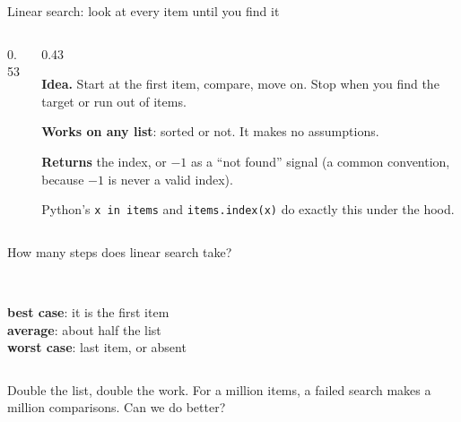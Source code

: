 \documentclass[aspectratio=169,10pt]{beamer}
\begin{document}
\begin{frame}{Linear search: look at every item until you find it}
\begin{columns}[T]
\begin{column}{0.53\textwidth}
\vspace{2mm}
\end{column}
\begin{column}{0.43\textwidth}
{\small
\textbf{Idea.} Start at the first item, compare, move on. Stop when you find the target or run out of items.

\vspace{2mm}
\textbf{Works on any list}: sorted or not. It makes no assumptions.

\vspace{2mm}
\textbf{Returns} the index, or $-1$ as a ``not found'' signal (a common convention, because $-1$ is never a valid index).

\vspace{2mm}
Python's \texttt{x in items} and \texttt{items.index(x)} do exactly this under the hood.}
\end{column}
\end{columns}
\end{frame}

\begin{frame}{How many steps does linear search take?}
\begin{sfig}[0.45]
\end{sfig}
\vspace{2mm}
\begin{columns}[T]
\\[-1pt]{\footnotesize \textbf{best case}: it is the first item}
\\[-1pt]{\footnotesize \textbf{average}: about half the list}
\\[-1pt]{\footnotesize \textbf{worst case}: last item, or absent}
\end{columns}
\vspace{2mm}
{\small Double the list, double the work. For a million items, a failed search makes a million comparisons. Can we do better?}
\end{frame}
\end{document}
